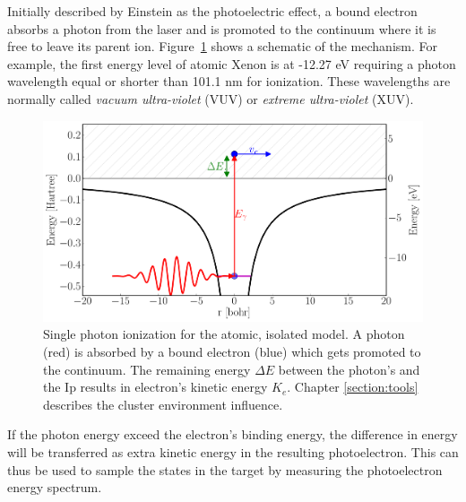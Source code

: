 
Initially described by Einstein as the photoelectric effect, a bound electron
absorbs a photon from the laser and is promoted to the continuum where it is
free to leave its parent ion. Figure~\ref{fig:ionization:single} shows a
schematic of the mechanism. For example, the first energy level of atomic
Xenon is at -12.27 eV requiring a photon wavelength equal or shorter than
101.1 nm for ionization. These wavelengths are normally called
\textit{vacuum ultra-violet} (VUV) or \textit{extreme ultra-violet} (XUV).



\begin{figure}
 \centering
 \includegraphics[width=\figurewidth]{figures/ionization_single}
 \caption{Single photon ionization for the atomic, isolated model. A photon
          (red) is absorbed by a bound electron (blue) which gets promoted to
          the continuum. The remaining energy $\Delta E$ between the photon's
          and the Ip results in electron's kinetic energy $K_e$.
          Chapter \ref{section:tools} describes the cluster environment
          influence.}
 \label{fig:ionization:single}
\end{figure}

If the photon energy exceed the electron's binding energy, the difference in energy
will be transferred as extra kinetic energy in the
resulting photoelectron. This can thus be used to sample the states in the
target by measuring the photoelectron energy spectrum\cite{Fennel2010}.

